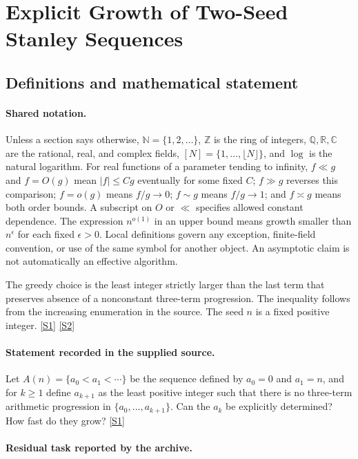 \documentclass[11pt,a4paper]{article}
\newcommand{\N}{\mathbb{N}}
\newcommand{\Z}{\mathbb{Z}}
\newcommand{\Q}{\mathbb{Q}}
\newcommand{\R}{\mathbb{R}}
\newcommand{\C}{\mathbb{C}}
\newcommand{\sref}[2]{\hyperlink{source:#1:#2}{[S#2]}}
\begin{document}
\section{Explicit Growth of Two-Seed Stanley Sequences}\label{statement}


\subsection{Definitions and mathematical statement}

\paragraph{Shared notation.}Unless a section says otherwise, $\N=\{1,2,\ldots\}$,
$\Z$ is the ring of integers, $\Q,\R,\C$ are the rational, real, and complex
fields, $[N]=\{1,\ldots,\lfloor N\rfloor\}$, and $\log$ is the natural
logarithm. For real functions of a parameter tending to infinity,
$f\ll g$ and $f=O(g)$ mean $|f|\leq Cg$ eventually for some fixed $C$;
$f\gg g$ reverses this comparison; $f=o(g)$ means $f/g\to0$;
$f\sim g$ means $f/g\to1$; and $f\asymp g$ means both order bounds.
A subscript on $O$ or $\ll$ specifies allowed constant dependence.
The expression $n^{o(1)}$ in an upper bound means growth smaller than
$n^\epsilon$ for each fixed $\epsilon>0$. Local definitions govern any
exception, finite-field convention, or use of the same symbol for another
object. An asymptotic claim is not automatically an effective algorithm.



The greedy choice is the least integer strictly larger than the last term that preserves absence of a nonconstant three-term progression. The inequality follows from the increasing enumeration in the source. The seed $n$ is a fixed positive integer. \sref{statement}{1} \sref{statement}{2}

\paragraph{Statement recorded in the supplied source.}
Let $A(n)=\{a_0<a_1<\cdots\}$ be the sequence defined by $a_0=0$ and $a_1=n$, and for $k\geq 1$ define $a_{k+1}$ as the least positive integer such that there is no three-term arithmetic progression in $\{a_0,\ldots,a_{k+1}\}$.
Can the $a_k$ be explicitly determined? How fast do they grow? \sref{statement}{1}

\paragraph{Residual task reported by the archive.}
\end{document}
